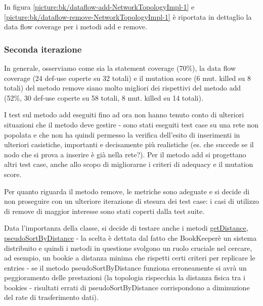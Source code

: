 \documentclass[10pt, a4paper]{article}
\newcommand{\getpicturelabel}[1]{picture:#1}
\def\bookkeeper{BookKeeper}
\begin{document}
	In figura \ref{\getpicturelabel{bk/dataflow-add-NetworkTopologyImpl-1}} e 
	\ref{\getpicturelabel{bk/dataflow-remove-NetworkTopologyImpl-1}} 
	è riportata in dettaglio la data flow coverage per i metodi add e remove.
	
	\subsubsection{Seconda iterazione}
	In generale, osserviamo come sia la statement coverage (70\%), la data flow coverage (24 def-use 
	coperte su 32 totali) e il mutation
	score (6 mut. killed su 8 totali) del metodo remove siano molto migliori dei rispettivi del metodo
	add (52\%, 30 def-use coperte su 58 totali, 8 mut. killed su 14 totali).
	
	I test sul metodo add eseguiti fino ad ora non hanno tenuto conto
	di ulteriori situazioni che il metodo deve gestire - sono stati eseguiti test case su una rete
	non popolata e che non ha quindi permesso la verifica dell'esito di inserimenti in ulteriori 
	casistiche, importanti e decisamente più realistiche 
	(es. che succede se il nodo che si prova a inserire è già nella rete?). Per il metodo add si
	progettano altri test case, anche allo scopo di migliorarne i criteri di adequacy e il mutation score.
	
	Per quanto riguarda il metodo remove, le metriche sono adeguate e si decide di non proseguire 
	con un ulteriore iterazione di stesura dei test case: i casi di utilizzo di remove di maggior interesse
	sono stati coperti dalla test suite.
	
	Data l'importanza della classe, si decide di testare anche i metodi 
	\href{https://bookkeeper.apache.org/docs/latest/api/javadoc/org/apache/bookkeeper/net/NetworkTopologyImpl.html#getDistance(org.apache.bookkeeper.net.Node,org.apache.bookkeeper.net.Node)}
	{getDistance},
	\href{https://bookkeeper.apache.org/docs/latest/api/javadoc/org/apache/bookkeeper/net/NetworkTopologyImpl.html#pseudoSortByDistance(org.apache.bookkeeper.net.Node,org.apache.bookkeeper.net.Node[])}
	{pseudoSortByDistance}
	- la scelta è dettata dal fatto che \bookkeeper\;è un sistema distribuito e quindi i metodi in questione svolgono un ruolo cruciale
	nel cercare, ad esempio, un bookie a distanza minima che rispetti certi criteri per replicare le entries - se il metodo pseudoSortByDistance
	funziona erroneamente si avrà un peggioramento delle prestazioni (la topologia rispecchia la distanza fisica tra i bookies - risultati errati di pseudoSortByDistance corrispondono a diminuzione del rate di trasferimento dati).
	
\end{document}
